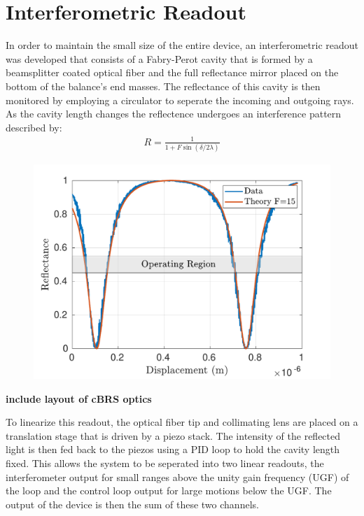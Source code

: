 \documentclass [12pt, proquest]{uwthesis}[2019]
\begin{document}
\section{Interferometric Readout}
In order to maintain the small size of the entire device, an interferometric readout was developed that consists of a Fabry-Perot cavity that is formed by a beamsplitter coated optical fiber and the full reflectance mirror placed on the bottom of the balance's end masses. The reflectance of this cavity is then monitored by employing a circulator to seperate the incoming and outgoing rays. As the cavity length changes the reflectence undergoes an interference pattern described by:
\begin{align}
R=\frac{1}{1+F \sin(\delta/2 \lambda)}
\end{align}

\begin{figure}%
\begin{center}
 \includegraphics[width=\textwidth]{cBRS_Fringes.pdf}
\caption{}
\label{cBRS_fringes}
\end{center}
\end{figure}

\textbf{include layout of cBRS optics}

To linearize this readout, the optical fiber tip and collimating lens are placed on a translation stage that is driven by a piezo stack. The intensity of the reflected light is then fed back to the piezos using a PID loop to hold the cavity length fixed. This allows the system to be seperated into two linear readouts, the interferometer output for small ranges above the unity gain frequency (UGF) of the loop and the control loop output for large motions below the UGF. The output of the device is then the sum of these two channels.
\end{document}

